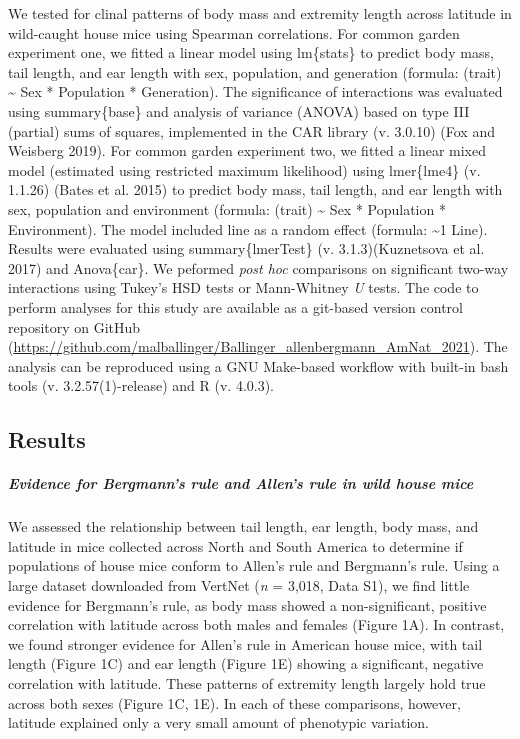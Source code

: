 \documentclass[]{article}
\let\oldsubparagraph\subparagraph
\renewcommand{\subparagraph}[1]{\oldsubparagraph{#1}\mbox{}}
\begin{document}
We tested for clinal patterns of body mass and extremity length across
latitude in wild-caught house mice using Spearman correlations. For
common garden experiment one, we fitted a linear model using lm\{stats\}
to predict body mass, tail length, and ear length with sex, population,
and generation (formula: (trait) \textasciitilde{} Sex * Population *
Generation). The significance of interactions was evaluated using
summary\{base\} and analysis of variance (ANOVA) based on type III
(partial) sums of squares, implemented in the CAR library (v. 3.0.10)
(Fox and Weisberg 2019). For common garden experiment two, we fitted a
linear mixed model (estimated using restricted maximum likelihood) using
lmer\{lme4\} (v. 1.1.26) (Bates et al. 2015) to predict body mass, tail
length, and ear length with sex, population and environment (formula:
(trait) \textasciitilde{} Sex * Population * Environment). The model
included line as a random effect (formula: \textasciitilde{}1 \textbar{}
Line). Results were evaluated using summary\{lmerTest\} (v.
3.1.3)(Kuznetsova et al. 2017) and Anova\{car\}. We peformed \emph{post
hoc} comparisons on significant two-way interactions using Tukey's HSD
tests or Mann-Whitney \emph{U} tests. The code to perform analyses for
this study are available as a git-based version control repository on
GitHub
(\url{https://github.com/malballinger/Ballinger_allenbergmann_AmNat_2021}).
The analysis can be reproduced using a GNU Make-based workflow with
built-in bash tools (v. 3.2.57(1)-release) and R (v. 4.0.3).

\vspace{5mm}

\hypertarget{results}{%
\subsection{Results}\label{results}}

\hypertarget{evidence-for-bergmanns-rule-and-allens-rule-in-wild-house-mice}{%
\subparagraph{\texorpdfstring{\emph{Evidence for Bergmann's rule and
Allen's rule in wild house
mice}}{Evidence for Bergmann's rule and Allen's rule in wild house mice}}\label{evidence-for-bergmanns-rule-and-allens-rule-in-wild-house-mice}}

We assessed the relationship between tail length, ear length, body mass,
and latitude in mice collected across North and South America to
determine if populations of house mice conform to Allen's rule and
Bergmann's rule. Using a large dataset downloaded from VertNet (\emph{n}
= 3,018, Data S1), we find little evidence for Bergmann's rule, as body
mass showed a non-significant, positive correlation with latitude across
both males and females (Figure 1A). In contrast, we found stronger
evidence for Allen's rule in American house mice, with tail length
(Figure 1C) and ear length (Figure 1E) showing a significant, negative
correlation with latitude. These patterns of extremity length largely
hold true across both sexes (Figure 1C, 1E). In each of these
comparisons, however, latitude explained only a very small amount of
phenotypic variation.
\end{document}

